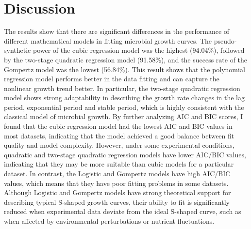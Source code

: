 \documentclass[11pt]{article}
\begin{document}
\section{Discussion}
The results show that there are significant differences in the performance of different mathematical models in fitting microbial growth curves. The pseudo-synthetic power of the cubic regression model was the highest (94.04\%), followed by the two-stage quadratic regression model (91.58\%), and the success rate of the Gompertz model was the lowest (56.84\%). This result shows that the polynomial regression model performs better in the data fitting and can capture the nonlinear growth trend better. In particular, the two-stage quadratic regression model shows strong adaptability in describing the growth rate changes in the lag period, exponential period and stable period, which is highly consistent with the classical model of microbial growth. By further analyzing AIC and BIC scores, I found that the cubic regression model had the lowest AIC and BIC values in most datasets, indicating that the model achieved a good balance between fit quality and model complexity. However, under some experimental conditions, quadratic and two-stage quadratic regression models have lower AIC/BIC values, indicating that they may be more suitable than cubic models for a particular dataset. In contrast, the Logistic and Gompertz models have high AIC/BIC values, which means that they have poor fitting problems in some datasets. Although Logistic and Gompertz models have strong theoretical support for describing typical S-shaped growth curves, their ability to fit is significantly reduced when experimental data deviate from the ideal S-shaped curve, such as when affected by environmental perturbations or nutrient fluctuations.
\end{document}
